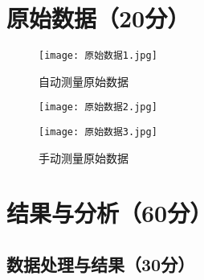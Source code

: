 \documentclass[]{../template/Report}%
\begin{document}
\begin{fullreportonly}
\section{原始数据（20分）}

\begin{figure}[H]
    \centering
    \texttt{[image: 原始数据1.jpg]}
    \caption{自动测量原始数据}
    \label{fig:原始数据记录}
\end{figure}
\begin{figure}[H]
\centering
\begin{minipage}[b]{0.48\textwidth}
	\centering
	\texttt{[image: 原始数据2.jpg]}
\end{minipage}\hfill
\begin{minipage}[b]{0.48\textwidth}
	\centering
	\texttt{[image: 原始数据3.jpg]}
\end{minipage}
\caption{手动测量原始数据}
\label{fig:手动测量原始数据}
\end{figure}
\section{结果与分析（60分）}
\subsection{数据处理与结果（30分）}


\end{fullreportonly}
\end{document}
